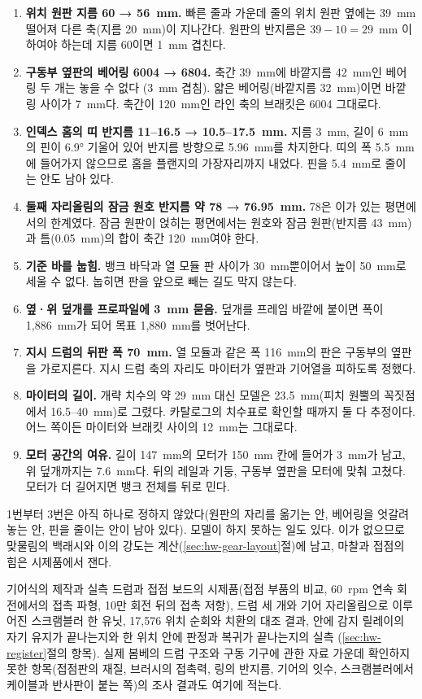 \begin{enumerate}
\item \textbf{위치 원판 지름 60 → 56~mm.} 빠른 줄과 가운데 줄의 위치 원판 옆에는 39~mm 떨어져 다른 축(지름
20~mm)이 지나간다. 원판의 반지름은 $39 - 10 = 29$~mm 이하여야 하는데 지름 60이면 1~mm 겹친다.
\item \textbf{구동부 옆판의 베어링 6004 → 6804.} 축간 39~mm에 바깥지름 42~mm인 베어링 두 개는 놓을 수 없다
(3~mm 겹침). 얇은 베어링(바깥지름 32~mm)이면 바깥 링 사이가 7~mm다. 축간이 120~mm인 라인 축의 브래킷은
6004 그대로다.
\item \textbf{인덱스 홈의 띠 반지름 11--16.5 → 10.5--17.5~mm.} 지름 3~mm, 길이 6~mm의 핀이 6.9° 기울어 있어
반지름 방향으로 5.96~mm를 차지한다. 띠의 폭 5.5~mm에 들어가지 않으므로 홈을 플랜지의 가장자리까지 내었다.
핀을 5.4~mm로 줄이는 안도 남아 있다.
\item \textbf{둘째 자리올림의 잠금 원호 반지름 약 78 → 76.95~mm.} 78은 이가 있는 평면에서의 한계였다. 잠금 원판이
얹히는 평면에서는 원호와 잠금 원판(반지름 43~mm)과 틈(0.05~mm)의 합이 축간 120~mm여야 한다.
\item \textbf{기준 바를 눕힘.} 뱅크 바닥과 열 모듈 판 사이가 30~mm뿐이어서 높이 50~mm로 세울 수 없다. 눕히면
판을 앞으로 빼는 길도 막지 않는다.
\item \textbf{옆·위 덮개를 프로파일에 3~mm 묻음.} 덮개를 프레임 바깥에 붙이면 폭이 1,886~mm가 되어 목표
1,880~mm를 벗어난다.
\item \textbf{지시 드럼의 뒤판 폭 70~mm.} 열 모듈과 같은 폭 116~mm의 판은 구동부의 옆판을 가로지른다. 지시 드럼
축의 자리도 마이터가 옆판과 기어열을 피하도록 정했다.
\item \textbf{마이터의 길이.} 개략 치수의 약 29~mm 대신 모델은 23.5~mm(피치 원뿔의 꼭짓점에서 16.5--40~mm)로
그렸다. 카탈로그의 치수표로 확인할 때까지 둘 다 추정이다. 어느 쪽이든 마이터와 브래킷 사이의 12~mm는
그대로다.
\item \textbf{모터 공간의 여유.} 길이 147~mm의 모터가 150~mm 칸에 들어가 3~mm가 남고, 위 덮개까지는 7.6~mm다.
뒤의 레일과 기둥, 구동부 옆판을 모터에 맞춰 고쳤다. 모터가 더 길어지면 뱅크 전체를 뒤로 민다.
\end{enumerate}

1번부터 3번은 아직 하나로 정하지 않았다(원판의 자리를 옮기는 안, 베어링을 엇갈려 놓는 안, 핀을 줄이는 안이
남아 있다). 모델이 하지 못하는 일도 있다. 이가 없으므로 맞물림의 백래시와 이의 강도는 계산(\ref{sec:hw-gear-layout}절)에
남고, 마찰과 접점의 힘은 시제품에서 잰다.

\begin{todobox}{기어식의 제작과 실측}
드럼과 접점 보드의 시제품(접점 부품의 비교, 60~rpm 연속 회전에서의 접촉 파형, 10만 회전 뒤의 접촉 저항),
드럼 세 개와 기어 자리올림으로 이루어진 스크램블러 한 유닛, 17,576 위치 순회와 치환의 대조 결과,
 안에 감지 릴레이의 자기 유지가 끝나는지와 한 위치 안에 판정과 복귀가 끝나는지의 실측
(\ref{sec:hw-register}절의 항목). 실제 봄베의 드럼 구조와 구동 기구에 관한 자료 가운데
확인하지 못한 항목(접점판의 재질, 브러시의 접촉력, 링의 반지름, 기어의 잇수, 스크램블러에서 케이블과 반사판이
붙는 쪽)의 조사 결과도 여기에 적는다.
\end{todobox}

